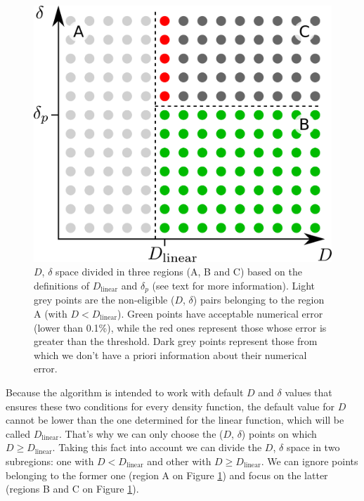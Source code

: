 \documentclass[extra]{gji}
\begin{document}
\begin{figure}
\centering
\includegraphics[width=\linewidth]
    {figures/D-delta-grid-search.pdf}
\caption{
    $D$, $\delta$ space divided in three regions (A, B and C) based on 
    the definitions of $D_\text{linear}$ and $\delta_p$ (see text for more 
    information).
    Light grey points are the non-eligible ($D$, $\delta$) pairs 
    belonging to the region A (with $D < D_\text{linear}$).
    Green points have acceptable numerical error (lower than 0.1\%), 
    while the red ones represent those whose error is greater than the 
    threshold.
    Dark grey points represent those from which we don't have a priori 
    information about their numerical error.}
\label{fig:D-delta-grid-search}
\end{figure}

Because the algorithm is intended to work with default $D$ and $\delta$ 
values that ensures these two conditions for every density function, 
the default value for $D$ cannot be lower than the one determined for 
the linear function, which will be called $D_\text{linear}$.
That's why we can only choose the ($D$, $\delta$) points on which
$D \geq D_\text{linear}$.
Taking this fact into account we can divide the $D$, $\delta$ space in 
two subregions: one with $D < D_\text{linear}$ and other with $D \ge 
D_\text{linear}$. We can ignore points belonging to the former one 
(region A on Figure \ref{fig:D-delta-grid-search}) and focus on the 
latter (regions B and C on Figure \ref{fig:D-delta-grid-search}).
\end{document}
